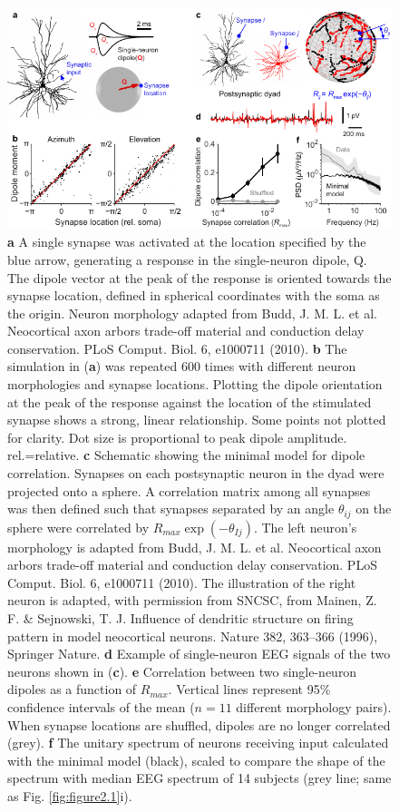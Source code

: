 \begin{figure}[t!]
    \centering
    \includegraphics[width=125mm]{Figures/chapter2/figure3.pdf}
    \caption{
	\textbf{a} A single synapse was activated at the location specified by the blue arrow, generating a response in the single-neuron dipole, Q. The dipole vector at the peak of the response is oriented towards the synapse location, defined in spherical coordinates with the soma as the origin. Neuron morphology adapted from Budd, J. M. L. et al. Neocortical axon arbors trade-off material and conduction delay conservation. PLoS Comput. Biol. 6, e1000711 (2010).
	\textbf{b} The simulation in (\textbf{a}) was repeated 600 times with different neuron morphologies and synapse locations. Plotting the dipole orientation at the peak of the response against the location of the stimulated synapse shows a strong, linear relationship. Some points not plotted for clarity. Dot size is proportional to peak dipole amplitude. rel.=relative. 
	\textbf{c} Schematic showing the minimal model for dipole correlation. Synapses on each postsynaptic neuron in the dyad were projected onto a sphere. A correlation matrix among all synapses was then defined such that synapses separated by an angle $\theta_{ij}$ on the sphere were correlated by $R_{max}\exp{(-\theta_{Ij})}$. The left neuron’s morphology is adapted from Budd, J. M. L. et al. Neocortical axon arbors trade-off material and conduction delay conservation. PLoS Comput. Biol. 6, e1000711 (2010). The illustration of the right neuron is adapted, with permission from SNCSC, from Mainen, Z. F. \& Sejnowski, T. J. Influence of dendritic structure on firing pattern in model neocortical neurons. Nature 382, 363–366 (1996), Springer Nature.
	\textbf{d} Example of single-neuron EEG signals of the two neurons shown in (\textbf{c}).
	\textbf{e} Correlation between two single-neuron dipoles as a function of $R_{max}$. Vertical lines represent 95\% confidence intervals of the mean ($n=11$ different morphology pairs). When synapse locations are shuffled, dipoles are no longer correlated (grey).
	\textbf{f} The unitary spectrum of neurons receiving input calculated with the minimal model (black), scaled to compare the shape of the spectrum with median EEG spectrum of 14 subjects (grey line; same as Fig. \ref{fig:figure2.1}i).} 
    \label{fig:figure2.3}
\end{figure}


